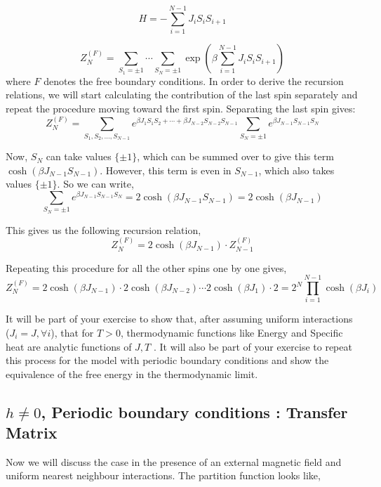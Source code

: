 \documentclass[11pt,a4paper]{article}
\begin{document}
\begin{equation}
    H = - \sum_{i=1}^{N-1} J_i S_i S_{i+1}
\end{equation}

\begin{equation}
    Z^{(F)}_N = \sum_{S_1 = \pm 1} \cdots \sum_{S_N = \pm 1} \exp \left( \beta \sum_{i=1}^{N-1} J_i S_i S_{i+1} \right)
\end{equation}
where $F$ denotes the free boundary conditions. In order to derive the recursion relations, we will start calculating the contribution of the last spin separately and repeat the procedure moving toward the first spin. Separating the last spin gives:
\begin{equation}
    Z^{(F)}_N = \sum_{S_1, S_2, \ldots, S_{N-1}} e^{\beta J_1 S_1 S_2 + \cdots + \beta J_{N-2} S_{N-2} S_{N-1}} \sum_{S_N = \pm 1} e^{\beta J_{N-1} S_{N-1} S_N}
\end{equation}

Now, $S_N$ can take values $\{\pm 1 \}$, which can be summed over to give this term $\cosh(\beta J_{N-1} S_{N-1})$. However, this term is even in $S_{N-1}$, which also takes values $\{\pm 1 \}$. So we can write,
\begin{equation}
    \sum_{S_N = \pm 1} e^{\beta J_{N-1} S_{N-1} S_N} = 2 \cosh(\beta J_{N-1} S_{N-1}) = 2 \cosh(\beta J_{N-1})
\end{equation}

This gives us the following recursion relation,
\begin{equation}
    Z^{(F)}_N = 2 \cosh(\beta J_{N-1}) \cdot Z^{(F)}_{N-1}
\end{equation}

Repeating this procedure for all the other spins one by one gives,
\begin{equation}
    Z^{(F)}_N = 2 \cosh(\beta J_{N-1}) \cdot 2 \cosh(\beta J_{N-2}) \cdots 2 \cosh(\beta J_1) \cdot 2 = 2^N \prod_{i=1}^{N-1} \cosh(\beta J_i)
\end{equation}

It will be part of your exercise to show that, after assuming uniform interactions ($J_i=J, \forall i$), that for $T > 0$, thermodynamic functions like Energy and Specific heat are analytic functions of $J, T$ . It will also be part of your exercise to repeat this process for the model with periodic boundary conditions and show the equivalence of the free energy in the thermodynamic limit.


\subsection{$h \neq 0$, Periodic boundary conditions : Transfer Matrix}
Now we will discuss the case in the presence of an external magnetic field and uniform nearest neighbour interactions. The partition function looks like,
\end{document}
